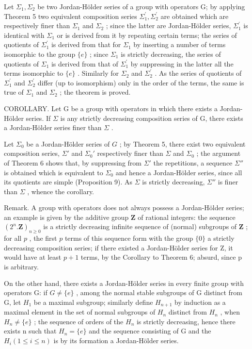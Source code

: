 Let \(\Sigma_{1}, \Sigma_{2}\) be two Jordan-Hölder series of a group with operators G; by applying Theorem 5 two equivalent composition series \(\Sigma_{1}^{\prime}, \Sigma_{2}^{\prime}\) are obtained which are respectively finer than \(\Sigma_{1}\) and \(\Sigma_{2}\) ; since the latter are Jordan-Hölder series, \(\Sigma_{1}^{\prime}\) is identical with \(\Sigma_{1}\) or is derived from it by repeating certain terms; the series of quotients of \(\Sigma_{1}^{\prime}\) is derived from that for \(\Sigma_{1}\) by inserting a number of terms isomorphic to the group \(\{e\}\) ; since \(\Sigma_{1}\) is strictly decreasing, the series of quotients of \(\Sigma_{1}\) is derived from that of \(\Sigma_{1}^{\prime}\) by suppressing in the latter all the terms isomorphic to \(\{e\}\) . Similarly for \(\Sigma_{2}\) and \(\Sigma_{2}^{\prime}\) . As the series of quotients of \(\Sigma_{1}^{\prime}\) and \(\Sigma_{2}^{\prime}\) differ (up to isomorphism) only in the order of the terms, the same is true of \(\Sigma_{1}\) and \(\Sigma_{2}\) ; the theorem is proved.

COROLLARY. Let G be a group with operators in which there exists a Jordan-Hölder series. If \(\Sigma\) is any strictly decreasing composition series of G, there exists a Jordan-Hölder series finer than \(\Sigma\) .

Let \(\Sigma_0\) be a Jordan-Hölder series of \(G\) ; by Theorem 5, there exist two equivalent composition series, \(\Sigma'\) and \(\Sigma_0'\) respectively finer than \(\Sigma\) and \(\Sigma_0\) ; the argument of Theorem 6 shows that, by suppressing from \(\Sigma'\) the repetitions, a sequence \(\Sigma''\) is obtained which is equivalent to \(\Sigma_0\) and hence a Jordan-Hölder series, since all its quotients are simple (Proposition 9). As \(\Sigma\) is strictly decreasing, \(\Sigma''\) is finer than \(\Sigma\) , whence the corollary.

Remark. A group with operators does not always possess a Jordan-Hölder series; an example is given by the additive group \(\mathbf{Z}\) of rational integers: the sequence \((2^{n}.\mathbf{Z})_{n\geqslant 0}\) is a strictly decreasing infinite sequence of (normal) subgroups of \(\mathbf{Z}\) ; for all \(p\) , the first \(p\) terms of this sequence form with the group \(\{0\}\) a strictly decreasing composition series; if there existed a Jordan-Hölder series for Z, it would have at least \(p + 1\) terms, by the Corollary to Theorem 6; absurd, since p is arbitrary.

On the other hand, there exists a Jordan-Hölder series in every finite group with operators G: if \(G \neq \{e\}\) , among the normal stable subgroups of G distinct from G, let \(H_{1}\) be a maximal subgroup; similarly define \(H_{n+1}\) by induction as a maximal element in the set of normal subgroups of \(H_{n}\) distinct from \(H_{n}\) , when \(H_{n} \neq \{e\}\) ; the sequence of orders of the \(H_{n}\) is strictly decreasing, hence there exists n such that \(H_{n} = \{e\}\) and the sequence consisting of G and the \(H_{i} (1 \leqslant i \leqslant n)\) is by its formation a Jordan-Hölder series.

